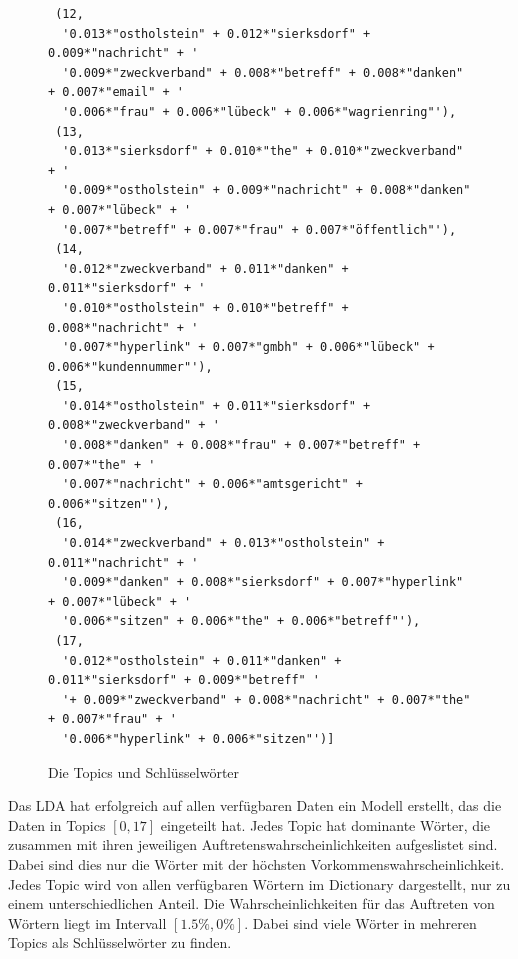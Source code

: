 \documentclass[german,version-2020-11]{uzl-thesis}
\begin{document}
  \begin{figure}[h]
  \begin{lstlisting}
 (12,
  '0.013*"ostholstein" + 0.012*"sierksdorf" + 0.009*"nachricht" + '
  '0.009*"zweckverband" + 0.008*"betreff" + 0.008*"danken" + 0.007*"email" + '
  '0.006*"frau" + 0.006*"lübeck" + 0.006*"wagrienring"'),
 (13,
  '0.013*"sierksdorf" + 0.010*"the" + 0.010*"zweckverband" + '
  '0.009*"ostholstein" + 0.009*"nachricht" + 0.008*"danken" + 0.007*"lübeck" + '
  '0.007*"betreff" + 0.007*"frau" + 0.007*"öffentlich"'),
 (14,
  '0.012*"zweckverband" + 0.011*"danken" + 0.011*"sierksdorf" + '
  '0.010*"ostholstein" + 0.010*"betreff" + 0.008*"nachricht" + '
  '0.007*"hyperlink" + 0.007*"gmbh" + 0.006*"lübeck" + 0.006*"kundennummer"'),
 (15,
  '0.014*"ostholstein" + 0.011*"sierksdorf" + 0.008*"zweckverband" + '
  '0.008*"danken" + 0.008*"frau" + 0.007*"betreff" + 0.007*"the" + '
  '0.007*"nachricht" + 0.006*"amtsgericht" + 0.006*"sitzen"'),
 (16,
  '0.014*"zweckverband" + 0.013*"ostholstein" + 0.011*"nachricht" + '
  '0.009*"danken" + 0.008*"sierksdorf" + 0.007*"hyperlink" + 0.007*"lübeck" + '
  '0.006*"sitzen" + 0.006*"the" + 0.006*"betreff"'),
 (17,
  '0.012*"ostholstein" + 0.011*"danken" + 0.011*"sierksdorf" + 0.009*"betreff" '
  '+ 0.009*"zweckverband" + 0.008*"nachricht" + 0.007*"the" + 0.007*"frau" + '
  '0.006*"hyperlink" + 0.006*"sitzen"')]
\end{lstlisting}
\caption{Die Topics und Schlüsselwörter}
\label{fig:codeoutput}
\end{figure}

Das LDA hat erfolgreich auf allen verfügbaren Daten ein Modell erstellt, das die Daten in Topics $[0,17]$ eingeteilt hat. Jedes Topic hat dominante Wörter, die zusammen mit ihren jeweiligen Auftretenswahrscheinlichkeiten aufgeslistet sind. Dabei sind dies nur die Wörter mit der höchsten Vorkommenswahrscheinlichkeit. Jedes Topic wird von allen verfügbaren Wörtern im Dictionary dargestellt, nur zu einem unterschiedlichen Anteil. Die Wahrscheinlichkeiten für das Auftreten von Wörtern liegt im Intervall $[1.5\%,0\%]$. Dabei sind viele Wörter in mehreren Topics als Schlüsselwörter zu finden. \\
\end{document}
